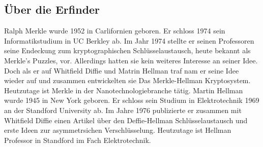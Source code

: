 \documentclass[a4paper,12pt,titlepage]{article}
\begin{document}
\subsection{Über die Erfinder}
Ralph Merkle wurde 1952 in Carlifornien geboren. Er schloss 1974 sein Informatikstudium in UC Berkley ab. Im Jahr 1974 stellte er seinen Professoren seine Endeckung zum kryptographischen Schlüsselaustausch, heute bekannt als Merkle's Puzzles, vor. Allerdings hatten sie kein weiteres Interesse an seiner Idee. Doch als er auf Whitfield Diffie und Matrin Hellman traf nam er seine Idee wieder auf und zusammen entwickelten sie Das Merkle-Hellman Kryptosystem. Heutzutage ist Merkle in der Nanotechnologiebranche tätig.  \newline Martin Hellman wurde 1945 in New York geboren. Er schloss sein Studium in Elektrotechnik 1969 an der Standford University ab. Im Jahre 1976 publizierte er zusammen mit Whitfield Diffie einen Artikel über den Deffie-Hellman Schlüsselaustausch und erste Ideen zur asymmetrsichen Verschlüsselung. Heutzutage ist Hellman Professor in Standford im Fach Elektrotechnik.
\end{document}
